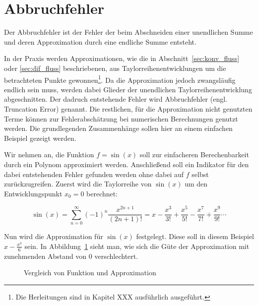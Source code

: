 \section{Abbruchfehler}

Der Abbruchfehler ist der Fehler der beim Abschneiden einer unendlichen Summe
und deren Approximation durch eine endliche Summe entsteht.

In der Praxis werden Approximationen, wie die in Abschnitt~\ref{sec:konv_fluss} oder
\ref{sec:dif_fluss} beschriebenen, aus Taylorreihenentwicklungen um die betrachteten
Punkte gewonnen\footnote{Die Herleitungen sind in Kapitel XXX ausführlich ausgeführt.}. 
Da die Approximation jedoch zwangsläufig endlich sein muss, werden
dabei Glieder der unendlichen Taylorreihenentwicklung abgeschnitten. Der dadruch entstehende
Fehler wird Abbruchfehler (engl. Truncation Error) genannt.
Die restlichen, für die Approximation nicht genutzten Terme können zur Fehlerabschätzung
bei numerischen Berechnungen genutzt werden. Die grundlegenden Zusammenhänge sollen hier an einem einfachen Beispiel gezeigt werden.

Wir nehmen an, die Funktion $f=\sin(x)$ soll zur einfacheren Berechenbarkeit durch
ein Polynom approximiert werden. Anschließend soll ein Indikator für den dabei
entstehenden Fehler gefunden werden ohne dabei auf $f$
selbst zurückzugreifen.
Zuerst wird die Taylorreihe von $\sin(x)$ um den Entwicklungspunkt $x_0 =0$ berechnet:

\begin{equation}
  \sin(x) = \sum_{n=0}^{\infty}(-1)^n \frac{x^{2n+1}}{(2n+1)!} = 
  x-\frac{x^3}{3!} +\frac{x^5}{5!} -\frac{x^7}{7!} +\frac{x^9}{9!}\cdots
 \label{eq:taylor_example}
\end{equation}

Nun wird die Approximation für $\sin(x)$ festgelegt. Diese soll in diesem Beispiel
$x-\frac{x^3}{6} $ sein. In Abbildung~\ref{fig:taylor_example} sieht man, wie sich die Güte der
Approximation mit zunehmenden Abstand von $0$ verschlechtert.

\begin{figure}[h]
\centering
\caption{Vergleich von Funktion und Approximation}
 \label{fig:taylor_example}
\end{figure}

